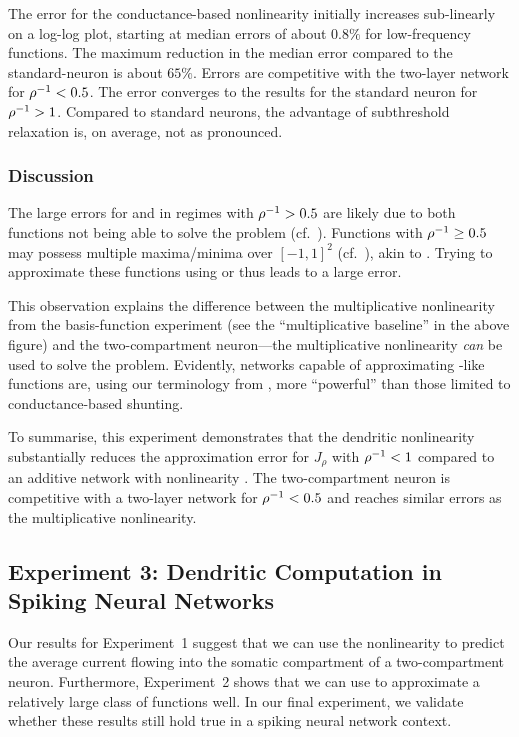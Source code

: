 The error for the conductance-based \twocomplif nonlinearity initially increases sub-linearly on a log-log plot, starting at median errors of about $0.8\%$ for low-frequency functions.
The maximum reduction in the median error compared to the standard-\LIF neuron is about $65\%$.
Errors are competitive with the two-layer network for ${\rho^{-1}} < 0.5$.
The error converges to the results for the standard \LIF neuron for ${\rho^{-1}} > 1$.
Compared to standard \LIF neurons, the advantage of subthreshold relaxation is, on average, not as pronounced.

\subsubsection{Discussion}
The large errors for \Hcur and \Hcond in regimes with ${\rho^{-1}} > 0.5$ are likely due to both functions not being able to solve the \XOR problem (cf.~).
Functions with ${\rho^{-1}} \geq 0.5$ may possess multiple maxima/minima over $[-1, 1]^2$ (cf.~), akin to \XOR.
Trying to approximate these functions using \Hcur or \Hcond thus leads to a large error.

This observation explains the difference between the multiplicative nonlinearity from the basis-function experiment (see the \enquote{multiplicative baseline} in the above figure) and the two-compartment \LIF neuron---the multiplicative nonlinearity \emph{can} be used to solve the \XOR problem.
Evidently, networks capable of approximating \XOR-like functions are, using our terminology from , more \enquote{powerful} than those limited to conductance-based shunting.

To summarise, this experiment demonstrates that the \twocomplif dendritic nonlinearity \Hcond substantially reduces the approximation error for $J_\rho$ with ${\rho^{-1}} < 1$ compared to an additive network with nonlinearity \Hcur.
The two-compartment neuron is competitive with a two-layer network for ${\rho^{-1}} < 0.5$ and reaches similar errors as the multiplicative nonlinearity.


\subsection{Experiment 3: Dendritic Computation in Spiking Neural Networks}
\label{sec:two_comp_lif_experiment_3}

Our results for Experiment~1 suggest that we can use the \twocomplif nonlinearity \Hcond to predict the average current flowing into the somatic compartment of a two-compartment neuron.
Furthermore, Experiment~2 shows that we can use \Hcond to approximate a relatively large class of functions well.
In our final experiment, we validate whether these results still hold true in a spiking neural network context.

